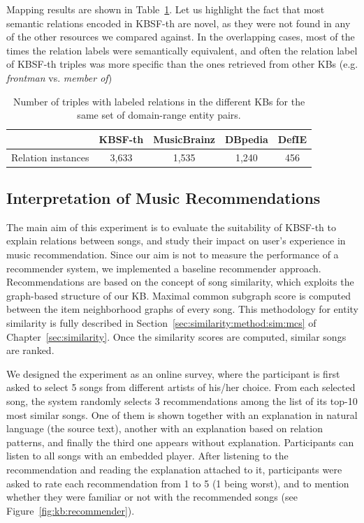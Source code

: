 Mapping results are shown in Table~\ref{tbl:kb:coverage}. Let us highlight the fact that most semantic relations encoded in \textsc{KBSF}-th are novel, as they were not found in any of the other resources we compared against. In the overlapping cases, most of the times the relation labels were semantically equivalent, and often the relation label of \textsc{KBSF}-th triples was more specific than the ones retrieved from other KBs (e.g. \textit{frontman} vs. \textit{member of})

\begin{table}[]
\centering
	\begin{tabular}{ c c c c c }
	\hline
	& KBSF-th & MusicBrainz & DBpedia & DefIE \\
	\hline
	Relation instances & 3,633 & 1,535 & 1,240 & 456 \\
	\hline
	\end{tabular}
	\caption[Number of triples with labeled relations in the different KBs.]{Number of triples with labeled relations in the different KBs for the same set of domain-range entity pairs.}
	\label{tbl:kb:coverage}
\end{table}


\subsection{Interpretation of Music Recommendations}
\label{sec:kb:experiments:recommendation}

The main aim of this experiment is to evaluate the suitability of \textsc{KBSF}-th to explain relations between songs, and study their impact on user's experience in music recommendation. 
Since our aim is not to measure the performance of a recommender system, we implemented a baseline recommender approach. Recommendations are based on the concept of song similarity, which exploits the graph-based structure of our KB. Maximal common subgraph score is computed between the item neighborhood graphs of every song. This methodology for entity similarity is fully described in Section~\ref{sec:similarity:method:sim:mcs} of Chapter~\ref{sec:similarity}. Once the similarity scores are computed, similar songs are ranked.


We designed the experiment as an online survey, where the participant is first asked to select 5 songs from different artists of his/her choice. From each selected song, the system randomly selects 3 recommendations among the list of its top-10 most similar songs. One of them is shown together with an explanation in natural language (the source text), another with an explanation based on relation patterns, and finally the third one appears without explanation.
Participants can listen to all songs with an embedded player. After listening to the recommendation and reading the explanation attached to it, participants were asked to rate each recommendation from 1 to 5 (1 being worst), and to mention whether they were familiar or not with the recommended songs (see Figure~\ref{fig:kb:recommender}).



